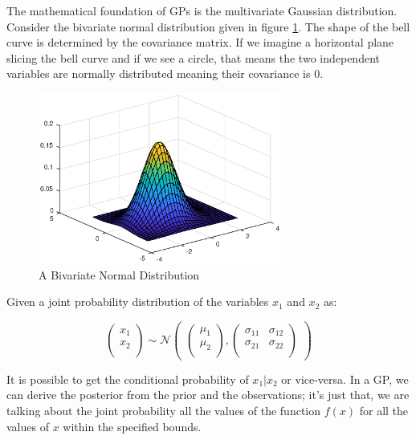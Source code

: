 \documentclass[12pt]{report}
\begin{document}
The mathematical foundation of GPs is the multivariate Gaussian distribution. Consider the bivariate normal distribution given in figure \ref{fig:bvnpdf}. The shape of the bell curve is determined by the covariance matrix. If we imagine a horizontal plane slicing the bell curve and if we see a circle, that means the two independent variables are normally distributed meaning their covariance is $0$.\par  
\begin{figure}[htp]
	\centering 
	\includegraphics[width=8cm]{bvnpdf.eps}
	\caption{A Bivariate Normal Distribution}
   \label{fig:bvnpdf}
\end{figure}
Given a joint probability distribution of the variables $x_1$ and $x_2$ as:

\begin{equation}
\begin{pmatrix}x_1\\
x_2\\
\end{pmatrix} 
\sim \mathcal{N}\begin{pmatrix} 
\begin{pmatrix}\mu_1\\
\mu_2\\
\end{pmatrix} ,\begin{pmatrix}\sigma_{11} & \sigma_{12}\\
\sigma_{21} & \sigma_{22}\\
\end{pmatrix} 
\end{pmatrix}
\end{equation}

It is possible to get the conditional probability of $x_1 | x_2$ or vice-versa. In a GP, we can derive the posterior from the prior and the observations; it's just that,  we are talking about the joint probability all the values of the function $f(x)$ for all the values of $x$ within the specified bounds.
\end{document}
